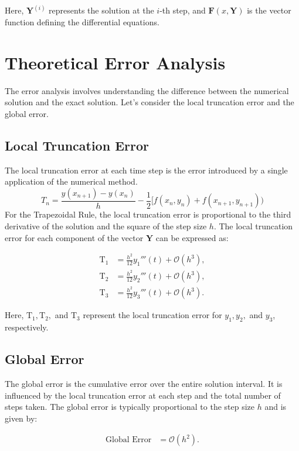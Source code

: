 \documentclass{article}
\begin{document}
Here, $\mathbf{Y}^{(i)}$ represents the solution at the $i$-th step, and $\mathbf{F}(x, \mathbf{Y})$ is the vector function defining the differential equations.

\section*{Theoretical Error Analysis}

The error analysis involves understanding the difference between the numerical solution and the exact solution. Let's consider the local truncation error and the global error.

\subsection*{Local Truncation Error}

The local truncation error at each time step is the error introduced by a single application of the numerical method. 
$$
T_n = \frac{y(x_{n+1}) - y(x_n)}{h} - \frac{1}{2} [ f(x_n, y_n) + f(x_{n+1}, y_{n+1}))
$$
For the Trapezoidal Rule, the local truncation error is proportional to the third derivative of the solution and the square of the step size $h$. The local truncation error for each component of the vector $\mathbf{Y}$ can be expressed as:

\begin{align}
    \text{T}_1 &= \frac{h^2}{12} y_{1}'''(t) + \mathcal{O}(h^3), \\
    \text{T}_2 &= \frac{h^2}{12} y_{2}'''(t) + \mathcal{O}(h^3), \\
    \text{T}_3 &= \frac{h^2}{12} y_{3}'''(t) + \mathcal{O}(h^3).
\end{align}

Here, $\text{T}_1, \text{T}_2,$ and $\text{T}_3$ represent the local truncation error for $y_{1}, y_{2},$ and $y_{3}$, respectively.

\subsection*{Global Error}

The global error is the cumulative error over the entire solution interval. It is influenced by the local truncation error at each step and the total number of steps taken. The global error is typically proportional to the step size $h$ and is given by:

\begin{align}
    \text{Global Error} &= \mathcal{O}(h^2).
\end{align}
\end{document}
